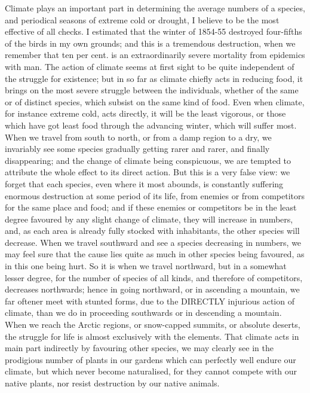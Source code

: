 Climate plays an important part in determining the average numbers of a species, and periodical seasons of extreme cold or drought, I believe to be the most effective of all checks. I estimated that the winter of 1854-55 destroyed four-fifths of the birds in my own grounds; and this is a tremendous destruction, when we remember that ten per cent. is an extraordinarily severe mortality from epidemics with man. The action of climate seems at first sight to be quite independent of the struggle for existence; but in so far as climate chiefly acts in reducing food, it brings on the most severe struggle between the individuals, whether of the same or of distinct species, which subsist on the same kind of food. Even when climate, for instance extreme cold, acts directly, it will be the least vigorous, or those which have got least food through the advancing winter, which will suffer most. When we travel from south to north, or from a damp region to a dry, we invariably see some species gradually getting rarer and rarer, and finally disappearing; and the change of climate being conspicuous, we are tempted to attribute the whole effect to its direct action. But this is a very false view: we forget that each species, even where it most abounds, is constantly suffering enormous destruction at some period of its life, from enemies or from competitors for the same place and food; and if these enemies or competitors be in the least degree favoured by any slight change of climate, they will increase in numbers, and, as each area is already fully stocked with inhabitants, the other species will decrease. When we travel southward and see a species decreasing in numbers, we may feel sure that the cause lies quite as much in other species being favoured, as in this one being hurt. So it is when we travel northward, but in a somewhat lesser degree, for the number of species of all kinds, and therefore of competitors, decreases northwards; hence in going northward, or in ascending a mountain, we far oftener meet with stunted forms, due to the DIRECTLY injurious action of climate, than we do in proceeding southwards or in descending a mountain. When we reach the Arctic regions, or snow-capped summits, or absolute deserts, the struggle for life is almost exclusively with the elements.
That climate acts in main part indirectly by favouring other species, we may clearly see in the prodigious number of plants in our gardens which can perfectly well endure our climate, but which never become naturalised, for they cannot compete with our native plants, nor resist destruction by our native animals.
